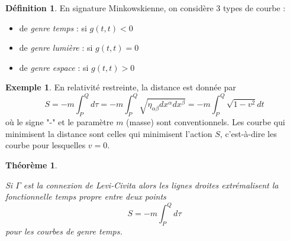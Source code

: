 \documentclass[a4paper,11pt]{report}
\theoremstyle{definition}
\theoremstyle{plain}
\newtheorem{thm}{Théorème}[chapter]
\theoremstyle{definition}
\newtheorem{defn}{Définition}[chapter]
\newtheorem{exmp}{Exemple}[chapter]
\theoremstyle{remark}
\begin{document}
            \begin{defn}
                En signature Minkowskienne, on considère 3 types de courbe :
                \begin{itemize}[label = \textbullet]
                    \item de \textit{genre temps} : si $g(t,t)<0$
                    \item de \textit{genre lumière} : si $g(t,t)=0$
                    \item de \textit{genre espace} : si $g(t,t)>0$
                \end{itemize}
            \end{defn}
            
            \begin{exmp}
                En relativité restreinte, la distance est donnée par
                \begin{equation}
                    S = -m\int_P^Qd\tau = -m\int_P^Q\sqrt{\eta_{\alpha\beta}dx^\alpha dx^\beta} = -m\int_P^Q\sqrt{1-v^2}dt
                \end{equation}
                où le signe "-" et le paramètre $m$ (masse) sont conventionnels. Les courbe qui minimisent la distance sont celles qui minimisent l'action $S$, c'est-à-dire les courbe pour lesquelles $v=0$.
            \end{exmp}
            
            \begin{thm}\begin{leftbar}
                Si $\Gamma$ est la connexion de Levi-Civita alors les lignes droites extrémalisent  la fonctionnelle temps propre entre deux points
                \begin{equation}
                    S = -m\int_P^Qd\tau
                \end{equation}
                pour les courbes de genre temps.
            \end{leftbar}\end{thm}
            
\end{document}
